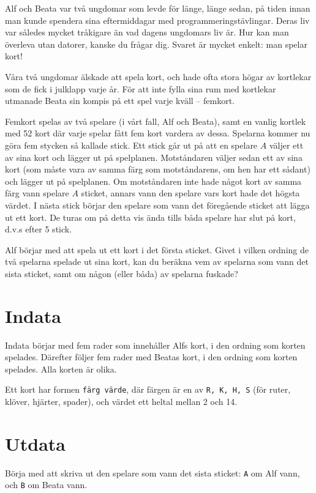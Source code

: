 Alf och Beata var två ungdomar som levde för länge, länge sedan, på tiden innan man kunde spendera sina eftermiddagar med programmeringstävlingar.
Deras liv var således mycket tråkigare än vad dagens ungdomars liv är.
Hur kan man överleva utan datorer, kanske du frågar dig.
Svaret är mycket enkelt: man spelar kort!

Våra två ungdomar älskade att spela kort, och hade ofta stora högar av kortlekar som de fick i julklapp varje år.
För att inte fylla sina rum med kortlekar utmanade Beata sin kompis på ett spel varje kväll -- femkort.

Femkort spelas av två spelare (i vårt fall, Alf och Beata), samt en vanlig kortlek med 52 kort där varje spelar fått fem kort vardera av dessa.
Spelarna kommer nu göra fem stycken så kallade stick.
Ett stick går ut på att en spelare $A$ väljer ett av sina kort och lägger ut på spelplanen.
Motståndaren väljer sedan ett av sina kort (som måste vara av samma färg som motståndarens, om hen har ett sådant) och lägger ut på spelplanen.
Om motståndaren inte hade något kort av samma färg vann spelare $A$ sticket, annars vann den spelare vars kort hade det högsta värdet.
I nästa stick börjar den spelare som vann det föregående sticket att lägga ut ett kort.
De turas om på detta vis ända tills båda spelare har slut på kort, d.v.s efter 5 stick.

Alf börjar med att spela ut ett kort i det första sticket.
Givet i vilken ordning de två spelarna spelade ut sina kort, kan du beräkna vem av spelarna som vann det sista sticket, samt om någon (eller båda) av spelarna fuskade?

\section*{Indata}
Indata börjar med fem rader som innehåller Alfs kort, i den ordning som korten spelades.
Därefter följer fem rader med Beatas kort, i den ordning som korten spelades. Alla korten är olika.

Ett kort har formen \texttt{färg värde}, där färgen är en av \texttt{R, K, H, S} (för ruter, klöver, hjärter, spader), och värdet ett heltal mellan 2 och 14. 

\section*{Utdata}
Börja med att skriva ut den spelare som vann det sista sticket: \texttt{A} om Alf vann, och \texttt{B} om Beata vann.

